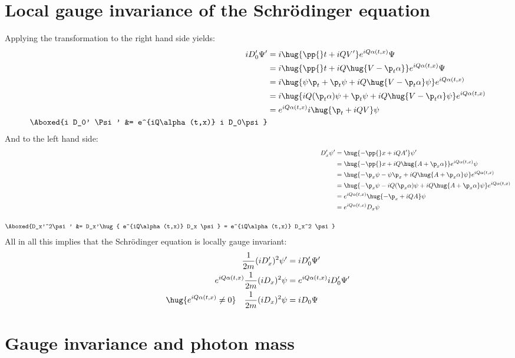 \documentclass[exb]{exercise_5.0}
\begin{document}
\section{Local gauge invariance of the Schrödinger equation}
Applying the transformation to the right hand side yields:
\begin{align*}
    i D_0' \Psi' &= i \hug{\pp{}t + iQV'} e^{iQ\alpha(t,x)}\Psi\\
    &= i \hug{\pp{}t + iQ\hug{V-\p_t \alpha}} e^{iQ\alpha(t,x)}\Psi\\
    &= i \hug{\psi \p_t +  \p_t \psi + iQ\hug{V-\p_t \alpha}\psi }e^{iQ\alpha(t,x)} \\
    &= i \hug{iQ(\p_t\alpha) \psi +  \p_t \psi + iQ\hug{V-\p_t \alpha}\psi }e^{iQ\alpha(t,x)} \\
    &= e^{iQ\alpha(t,x)} i \hug{\p_t + iQV  }\psi \\
    \Aboxed{i D_0' \Psi'  &= e^{iQ\alpha(t,x)} i D_0\psi}
\end{align*}
And to the left hand side:
\begin{align*}
    D_x' \psi' &= \hug{-\pp{}x + iQA'}\psi'\\
    &= \hug{-\pp{}x + iQ\hug{A+ \p_x \alpha}} e^{iQ\alpha(t,x)} \psi\\
    &= \hug{-\p_x \psi - \psi \p_x + iQ\hug{A+ \p_x \alpha}\psi} e^{iQ\alpha(t,x)} \\
    &= \hug{-\p_x \psi - iQ (\p_x\alpha )\psi  + iQ\hug{A+ \p_x \alpha}\psi} e^{iQ\alpha(t,x)} \\
    &= e^{iQ\alpha(t,x)} \hug{-\p_x + iQA} \psi\\
    &= e^{iQ\alpha(t,x)} D_x \psi\\
    \\
    \Aboxed{D_x'^2\psi'
    &= D_x'\hug{ e^{iQ\alpha(t,x)} D_x \psi} = e^{iQ\alpha(t,x)} D_x^2 \psi}
\end{align*}
All in all this implies that the Schrödinger equation is locally gauge invariant:
\begin{align*}
    \frac1{2m} (i D_x')^2 \psi' &= i D_0' \Psi'\\ 
    e^{iQ\alpha(t,x)} \frac1{2m} (i D_x)^2 \psi &= e^{iQ\alpha(t,x)} i D_0' \Psi'\\ 
    \hug{e^{iQ\alpha(t,x)} \neq 0}\quad \frac1{2m} (i D_x)^2 \psi &= i D_0 \Psi\\ 
\end{align*}

\section{Gauge invariance and photon mass}
\end{document}
